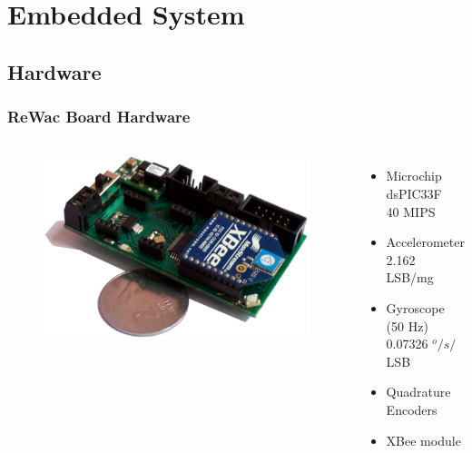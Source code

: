 \section{Embedded System}
\subsection*{Hardware}
\begin{frame}
\frametitle{ReWac Board Hardware}
    \begin{columns}
        \begin{figure}
        \centering
        \includegraphics[scale=0.2]{fig/rewac.png}
        \end{figure}
        
        \begin{itemize}
        \item
        Microchip dsPIC33F\\[0.05in]
        40 MIPS\\[0.1in]
        \item
        Accelerometer\\[0.05in]
        2.162 LSB/mg\\[0.1in]
        \item
        Gyroscope (50 Hz)\\[0.05in]
        0.07326 $^o/s/$LSB\\[0.1in]
        \item
        Quadrature Encoders\\[0.1in]
        \item
        XBee module\\[0.1in]
        \end{itemize}
    \end{columns}
\end{frame}

